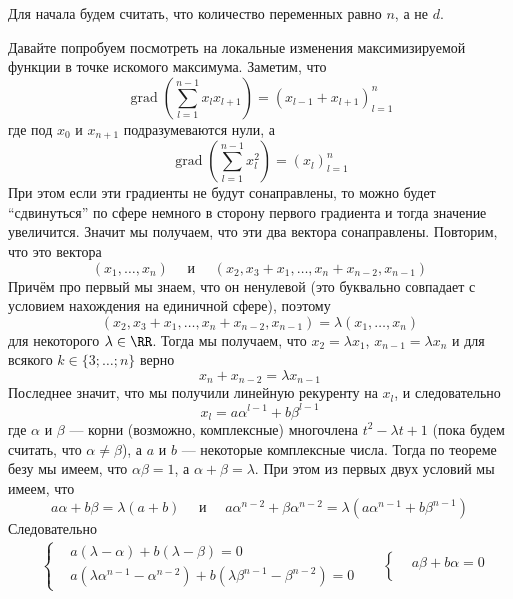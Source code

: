 \documentclass[12pt,a4paper]{article}
\DeclareMathOperator{\grad}{grad}
\begin{document}
    \begin{enumproblem}
        Для начала будем считать, что количество переменных равно $n$, а не $d$.

        Давайте попробуем посмотреть на локальные изменения максимизируемой функции в точке искомого максимума. Заметим, что
        \[\grad\left(\sum_{l=1}^{n-1} x_l x_{l+1}\right) = (x_{l-1} + x_{l+1})_{l=1}^n\]
        где под $x_0$ и $x_{n+1}$ подразумеваются нули, а
        \[\grad\left(\sum_{l=1}^{n-1} x_l^2\right) = (x_l)_{l=1}^n\]
        При этом если эти градиенты не будут сонаправлены, то можно будет ``сдвинуться'' по сфере немного в сторону первого градиента и тогда значение увеличится. Значит мы получаем, что эти два вектора сонаправлены. Повторим, что это вектора
        \[
            (x_1, \dots, x_n)
            \quad \text{ и } \quad
            (x_2, x_3 + x_1, \dots, x_n + x_{n-2}, x_{n-1})
        \]
        Причём про первый мы знаем, что он ненулевой (это буквально совпадает с условием нахождения на единичной сфере), поэтому
        \[(x_2, x_3 + x_1, \dots, x_n + x_{n-2}, x_{n-1}) = \lambda (x_1, \dots, x_n)\]
        для некоторого $\lambda \in \RR$. Тогда мы получаем, что $x_2 = \lambda x_1$, $x_{n-1} = \lambda x_n$ и для всякого $k \in \{3; \dots; n\}$ верно
        \[x_n + x_{n-2} = \lambda x_{n-1}\]
        Последнее значит, что мы получили линейную рекуренту на $x_l$, и следовательно
        \[x_l = a \alpha^{l-1} + b \beta^{l-1}\]
        где $\alpha$ и $\beta$ --- корни (возможно, комплексные) многочлена $t^2 - \lambda t + 1$ (пока будем считать, что $\alpha \neq \beta$), а $a$ и $b$ --- некоторые комплексные числа. Тогда по теореме безу мы имеем, что $\alpha \beta = 1$, а $\alpha + \beta = \lambda$. При этом из первых двух условий мы имеем, что
        \[
            a \alpha + b \beta = \lambda(a + b)
            \quad \text{ и } \quad
            a \alpha^{n-2} + \beta \alpha^{n-2} = \lambda(a \alpha^{n-1} + b \beta^{n-1})
        \]
        Следовательно
        \begin{align*}
            &\left\{
                \begin{aligned}
                    &a(\lambda - \alpha) + b(\lambda - \beta) = 0\\
                    &a(\lambda \alpha^{n-1} - \alpha^{n-2}) + b(\lambda \beta^{n-1} - \beta^{n-2}) = 0
                \end{aligned}
            \right.&
            &\left\{
                \begin{aligned}
                    &a\beta + b\alpha = 0\\

\end{aligned}
\end{align*}
\end{enumproblem}
\end{document}
